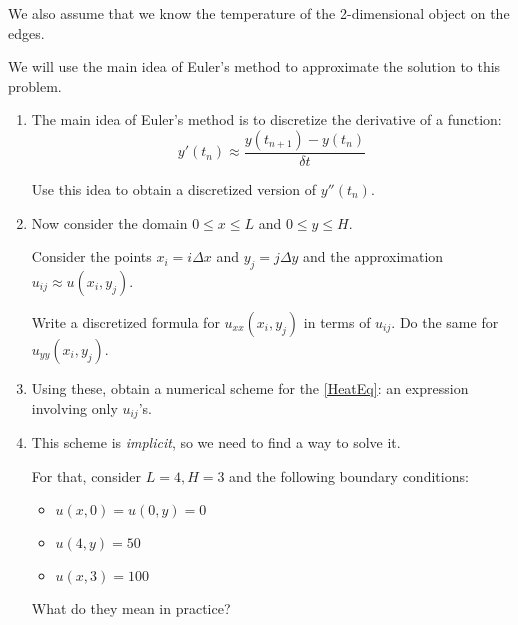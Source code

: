 \documentclass[letter]{article}
\begin{document}
We also assume that we know the temperature of the 2-dimensional object on the edges.

We will use the main idea of Euler's method to approximate the solution to this problem.


\begin{enumerate}[resume, label=\textbf{\arabic*.}]
	\item The main idea of Euler's method is to discretize the derivative of a function:
	\[ y'(t_n) \approx \frac{y(t_{n+1}) - y(t_n)}{\delta t} \]
	
	Use this idea to obtain a discretized version of $y''(t_n)$.
	
	
	\item Now consider the domain $0 \leq x \leq L$ and $0 \leq y \leq H$.
	\begin{center}
	\end{center}

	Consider the points $x_i = i \Delta x$ and $y_j = j \Delta y$ and the approximation $u_{ij} \approx u(x_i ,y_j)$.
	
	Write a discretized formula for $u_{xx}(x_i,y_j)$ in terms of $u_{ij}$. Do the same for $u_{yy}(x_i,y_j)$.
	
	\item Using these, obtain a numerical scheme for the \ref{HeatEq}: an expression involving only $u_{ij}$'s.
	
	\item This scheme is \textit{implicit}, so we need to find a way to solve it.
	
	For that, consider $L=4, H=3$ and the following boundary conditions:
	\begin{itemize}
		\item $u(x,0) = u(0,y) = 0$
		\item $u(4,y) = 50$
		\item $u(x,3) = 100$
	\end{itemize}
	
	What do they mean in practice?
	

\end{enumerate}
\end{document}
